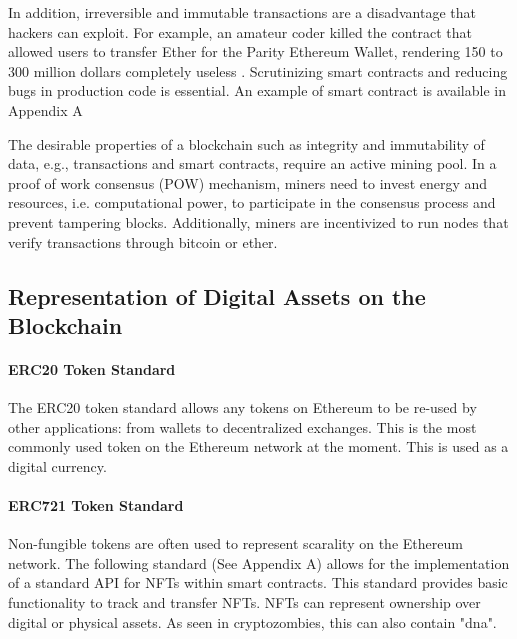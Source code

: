\documentclass[12pt,tightenlines,letterpaper]{scrartcl}
\begin{document}
		In addition, irreversible and immutable transactions are a disadvantage that hackers can exploit. For example, an amateur coder killed the contract that allowed users to transfer Ether for the Parity \gls{Ethereum} Wallet, rendering 150 to 300 million dollars completely useless \cite{funnyJoke:Online}. Scrutinizing smart contracts and reducing bugs in production code is essential. An example of smart contract is available in Appendix A%
		
		The desirable properties of a \gls{blockchain} such as integrity and immutability of data, e.g., transactions and
		smart contracts, require an active mining pool. In a proof of work consensus (POW) mechanism,  miners need to invest energy and resources,
		i.e. computational power, to participate in the consensus process and prevent tampering blocks. Additionally, miners are incentivized to run nodes that verify transactions through bitcoin or ether. %
	
\subsection{Representation of Digital Assets on the Blockchain}

\paragraph{ERC20 Token Standard}

The ERC20 token standard allows any tokens on Ethereum to be re-used by other applications: from wallets to decentralized exchanges. This is the most commonly used token on the Ethereum network at the moment. This is used as a digital currency.


\paragraph{ERC721 Token Standard}

Non-fungible tokens are often used to represent scarality on the \gls{Ethereum} network.
The following standard (See Appendix A) allows for the implementation of a standard API for NFTs within smart contracts. This standard provides basic functionality to track and transfer NFTs.
NFTs can represent ownership over digital or physical assets. As seen in cryptozombies, this can also contain "dna".
\end{document}
